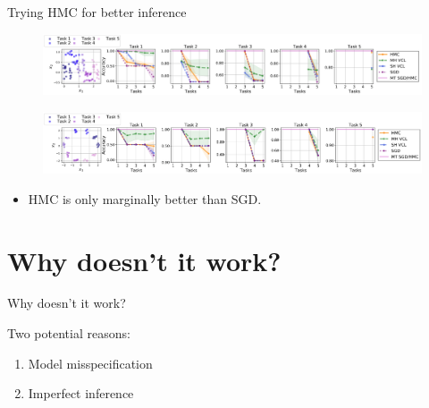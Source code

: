 \documentclass[12pt,aspectratio=169, handout]{beamer}
\let\olditem\item
\renewcommand\item{\olditem\justifying}
\begin{document}
\begin{frame}{Trying HMC for better inference}
    \begin{figure}
		\centering
		\includegraphics[width=\textwidth]{"images/Fig3_pic.png"}
	\end{figure}
    \vspace{-1em}
    \begin{figure}
		\centering
		\includegraphics[width=\textwidth]{"images/FigA1_pic.png"}
	\end{figure}
 
    

    \begin{itemize}
        \item HMC is only marginally better than SGD.
    \end{itemize}
 
\end{frame}

\section{Why doesn't it work?}
\begin{frame}{Why doesn't it work?}

Two potential reasons:
\begin{enumerate}
    \item Model misspecification
    \item Imperfect inference
\end{enumerate}

\end{frame}
\end{document}
